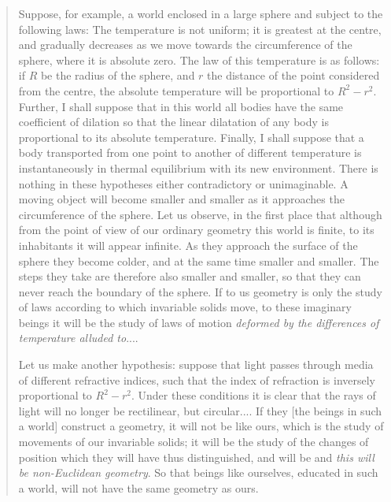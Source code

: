 \blockquote{
Suppose, for example, a world enclosed in a large sphere and subject to the following laws: The temperature is not uniform; it is greatest at the centre, and gradually decreases as we move towards the circumference of the sphere, where it is absolute zero. The law of this temperature is as follows: if $R$ be the radius of the sphere, and $r$ the distance of the point considered from the centre, the absolute temperature will be proportional to $R^2 - r^2$. Further, I shall suppose that in this world all bodies have the same coefficient of dilation so that the linear dilatation of any body is proportional to its absolute temperature. Finally, I shall suppose that a body transported from one point to another of different temperature is instantaneously in thermal equilibrium with its new environment. There is nothing in these hypotheses either contradictory or unimaginable. A moving object will become smaller and smaller as it approaches the circumference of the sphere. Let us observe, in the first place that although from the point of view of our ordinary geometry this world is finite, to its inhabitants it will appear infinite. As they approach the surface of the sphere they become colder, and at the same time smaller and smaller. The steps they take are therefore also smaller and smaller, so that they can never reach the boundary of the sphere. If to us geometry is only the study of laws according to which invariable solids move, to these imaginary beings it will be the study of laws of motion \emph{deformed by the differences of temperature alluded to}.... \par 
Let us make another hypothesis: suppose that light passes through media of different refractive indices, such that the index of refraction is inversely proportional to $R^2 - r^2$. Under these conditions it is clear that the rays of light will no longer be rectilinear, but circular.... If they [the beings in such a world] construct a geometry, it will not be like ours, which is the study of movements of our invariable solids; it will be the study of the changes of position which they will have thus distinguished, and will be  and \emph{this will be non-Euclidean geometry}. So that beings like ourselves, educated in such a world, will not have the same geometry as ours.
} 
